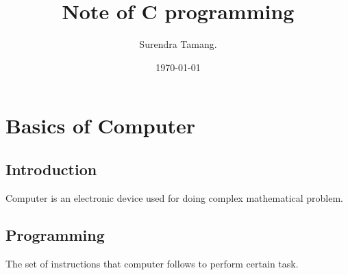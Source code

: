 \documentclass[11pt]{article}
\author{Surendra Tamang.}
\date{\today}
\title{Note of C programming}
\begin{document}
\maketitle
\tableofcontents

\section{Basics of Computer}
\label{sec:orgf60c645}
\subsection{Introduction}
\label{sec:org5eaa96d}
Computer is an electronic device used for doing complex mathematical problem.
\subsection{Programming}
\label{sec:org8437ce0}
The set of instructions that computer follows to perform certain task.
\end{document}
